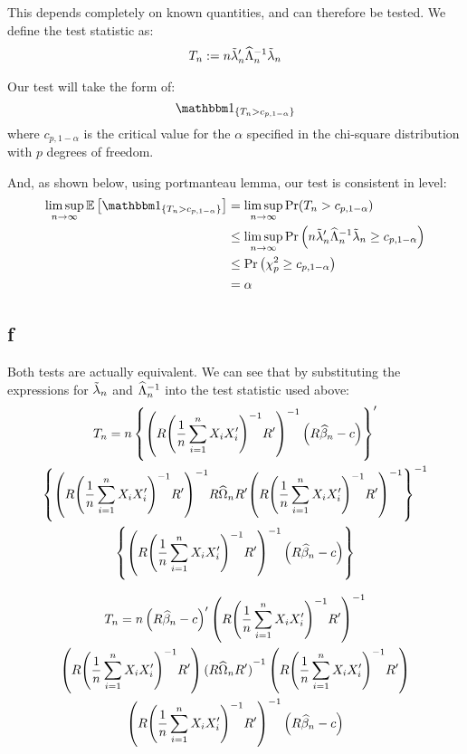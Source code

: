 \documentclass[12pt]{paper}
\begin{document}
This depends completely on known quantities, and can therefore be
tested. We define the test statistic as:
\begin{align*}
 T_n:= n \tilde{ \lambda }_{n}' {\widehat{ \Lambda }_{n}}^{-1} \tilde{ \lambda }_{n}
\end{align*}

Our test will take the form of:
\begin{equation*}
  \indicate{T_n > c_{p,1-\alpha}}
\end{equation*}
where $c_{p,1-\alpha}$ is the critical value for the $\alpha$ specified in the chi-square distribution with $p$ degrees of freedom.

And, as shown below, using portmanteau lemma, our test is consistent in level:
\begin{align*}
  \limsup_{n\rightarrow\infty} \exV{\indicate{T_n >  c_{p,1-\alpha}}} &= 
                \limsup_{n\rightarrow\infty}\Pr(T_n> c_{p,1-\alpha})\\
  &\le  \limsup_{n\rightarrow\infty} \Pr \left( n \altest{\lambda}' \inv{\est{\Lambda}} \altest{\lambda} \ge  c_{p,1-\alpha} \right)\\
  &\le \Pr \left( \chi_p^2 \ge  c_{p,1-\alpha} \right)\\
  &= \alpha
\end{align*}

\subsection*{f}
Both tests are actually equivalent. We can see that by substituting the expressions for $\tilde{ \lambda }_{n}$ and ${\widehat{ \Lambda }_{n}}^{-1}$ into the test statistic used above:
\begin{multline*}
 T_n=n\left\{ { \left( R { \left( \frac{1}{n} \sum_{i=1}^n X_i
               X_i' \right)}^{-1} R' \right)}^{-1} \left(  R \widehat{ \beta }_{n} - c \right)\right\}' \\
               {\left\{{ \left( R { \left( \frac{1}{n} \sum_{i=1}^n X_i
               X_i' \right)}^{-1} R' \right)}^{-1}R\widehat{ \Omega }_{n}R'{ \left( R { \left( \frac{1}{n} \sum_{i=1}^n X_i
               X_i' \right)}^{-1} R' \right)}^{-1}\right\}}^{-1}\\
               \left\{ { \left( R { \left( \frac{1}{n} \sum_{i=1}^n X_i
               X_i' \right)}^{-1} R' \right)}^{-1} \left(  R \widehat{ \beta }_{n} - c \right)\right\}
\end{multline*}

\begin{multline*}
 T_n=n  \left(  R \widehat{ \beta }_{n} - c \right)' { \left( R { \left( \frac{1}{n} \sum_{i=1}^n X_i
               X_i' \right)}^{-1} R' \right)}^{-1} \\
                \left( R { \left( \frac{1}{n} \sum_{i=1}^n X_i
               X_i' \right)}^{-1} R' \right) {(R\widehat{ \Omega }_{n}R')}^{-1}  \left( R { \left( \frac{1}{n} \sum_{i=1}^n X_i
               X_i' \right)}^{-1} R' \right) \\
                { \left( R { \left( \frac{1}{n} \sum_{i=1}^n X_i
               X_i' \right)}^{-1} R' \right)}^{-1} \left(  R \widehat{ \beta }_{n} - c \right)
\end{multline*}
\end{document}
